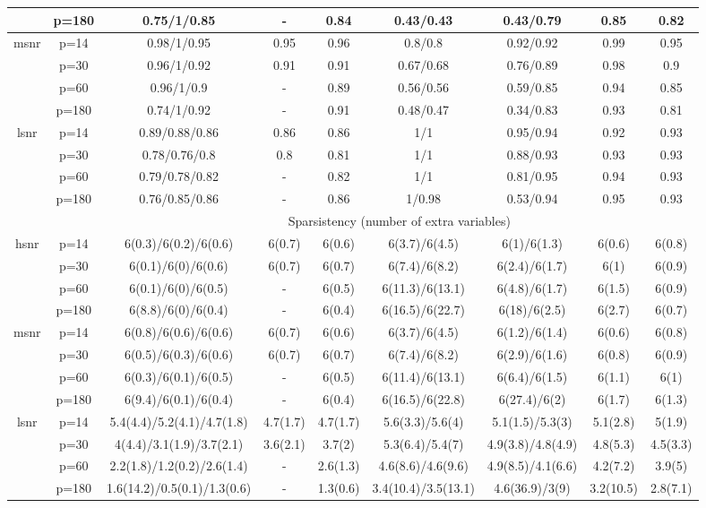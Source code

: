 \begin{table}[ht]
{\begin{tabular}{|c|c|ccccccc|}
   & p=180 & 0.75/1/0.85 & - & 0.84 & 0.43/0.43 & 0.43/0.79 & 0.85 & 0.82 \\ 
  \midrule\multirow{4}[2]{*}{msnr} & p=14 & 0.98/1/0.95 & 0.95 & 0.96 & 0.8/0.8 & 0.92/0.92 & 0.99 & 0.95 \\ 
   & p=30 & 0.96/1/0.92 & 0.91 & 0.91 & 0.67/0.68 & 0.76/0.89 & 0.98 & 0.9 \\ 
   & p=60 & 0.96/1/0.9 & - & 0.89 & 0.56/0.56 & 0.59/0.85 & 0.94 & 0.85 \\ 
   & p=180 & 0.74/1/0.92 & - & 0.91 & 0.48/0.47 & 0.34/0.83 & 0.93 & 0.81 \\ 
  \midrule\multirow{4}[2]{*}{lsnr} & p=14 & 0.89/0.88/0.86 & 0.86 & 0.86 & 1/1 & 0.95/0.94 & 0.92 & 0.93 \\ 
   & p=30 & 0.78/0.76/0.8 & 0.8 & 0.81 & 1/1 & 0.88/0.93 & 0.93 & 0.93 \\ 
   & p=60 & 0.79/0.78/0.82 & - & 0.82 & 1/1 & 0.81/0.95 & 0.94 & 0.93 \\ 
   & p=180 & 0.76/0.85/0.86 & - & 0.86 & 1/0.98 & 0.53/0.94 & 0.95 & 0.93 \\ 
   \midrule 
 \multicolumn{1}{|c}{} &       & \multicolumn{7}{c|}{Sparsistency (number of extra variables)} \\
\midrule\multirow{4}[2]{*}{hsnr} & p=14 & 6(0.3)/6(0.2)/6(0.6) & 6(0.7) & 6(0.6) & 6(3.7)/6(4.5) & 6(1)/6(1.3) & 6(0.6) & 6(0.8) \\ 
   & p=30 & 6(0.1)/6(0)/6(0.6) & 6(0.7) & 6(0.7) & 6(7.4)/6(8.2) & 6(2.4)/6(1.7) & 6(1) & 6(0.9) \\ 
   & p=60 & 6(0.1)/6(0)/6(0.5) & - & 6(0.5) & 6(11.3)/6(13.1) & 6(4.8)/6(1.7) & 6(1.5) & 6(0.9) \\ 
   & p=180 & 6(8.8)/6(0)/6(0.4) & - & 6(0.4) & 6(16.5)/6(22.7) & 6(18)/6(2.5) & 6(2.7) & 6(0.7) \\ 
  \midrule\multirow{4}[2]{*}{msnr} & p=14 & 6(0.8)/6(0.6)/6(0.6) & 6(0.7) & 6(0.6) & 6(3.7)/6(4.5) & 6(1.2)/6(1.4) & 6(0.6) & 6(0.8) \\ 
   & p=30 & 6(0.5)/6(0.3)/6(0.6) & 6(0.7) & 6(0.7) & 6(7.4)/6(8.2) & 6(2.9)/6(1.6) & 6(0.8) & 6(0.9) \\ 
   & p=60 & 6(0.3)/6(0.1)/6(0.5) & - & 6(0.5) & 6(11.4)/6(13.1) & 6(6.4)/6(1.5) & 6(1.1) & 6(1) \\ 
   & p=180 & 6(9.4)/6(0.1)/6(0.4) & - & 6(0.4) & 6(16.5)/6(22.8) & 6(27.4)/6(2) & 6(1.7) & 6(1.3) \\ 
  \midrule\multirow{4}[2]{*}{lsnr} & p=14 & 5.4(4.4)/5.2(4.1)/4.7(1.8) & 4.7(1.7) & 4.7(1.7) & 5.6(3.3)/5.6(4) & 5.1(1.5)/5.3(3) & 5.1(2.8) & 5(1.9) \\ 
   & p=30 & 4(4.4)/3.1(1.9)/3.7(2.1) & 3.6(2.1) & 3.7(2) & 5.3(6.4)/5.4(7) & 4.9(3.8)/4.8(4.9) & 4.8(5.3) & 4.5(3.3) \\ 
   & p=60 & 2.2(1.8)/1.2(0.2)/2.6(1.4) & - & 2.6(1.3) & 4.6(8.6)/4.6(9.6) & 4.9(8.5)/4.1(6.6) & 4.2(7.2) & 3.9(5) \\ 
   & p=180 & 1.6(14.2)/0.5(0.1)/1.3(0.6) & - & 1.3(0.6) & 3.4(10.4)/3.5(13.1) & 4.6(36.9)/3(9) & 3.2(10.5) & 2.8(7.1) \\ 
   \bottomrule 
\end{tabular}
}
\end{table}
